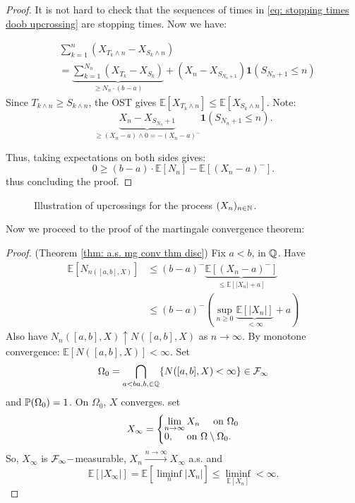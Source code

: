 \documentclass{article}
\begin{document}
\begin{proof}
	It is not hard to check that the sequences of times in \ref{eq: stopping times doob upcrossing} are stopping times. Now we have:

\[
\begin{array}{ll}
   &\displaystyle\sum^{n}_{k=1}(X_{T_{k}\land n}-X_{S_{k}\land n})\\
   &=\underbrace{\displaystyle\sum^{N_{n}}_{k=1} (X_{T_{k}}-X_{S_{k}})}_{\geq N_{n}\cdot (b-a)} + (X_{n}-X_{S_{N_{n}+1}}) \mathbf{1}(S_{N_{n}+1}\leq n)
\end{array}
\]
Since $ T_{k\land n}\geq S_{k\land n}$, the OST gives $\mathbb{E}[X_{T_{k}\land n}]\leq\mathbb{E}[X_{S_{k}\land n}]$. Note: 
\[
\underbrace{X_{n}-X_{S_{N_{n}}+1}}_{\geq (X_{n}-a) \land 0 = -(X_{n}-a)^{-}} \mathbf{1}(S_{N_{n}+1}\leq n).\]

Thus, taking expectations on both sides gives:	
	\[
		0 \geq (b-a)\cdot\mathbb{E}[N_{n}]-\mathbb{E}[(X_{n}-a)^{-}].
	\]
	thus concluding the proof.
\end{proof}


\begin{figure}[H]
    \centering
    
    \caption{Illustration of upcrossings for the process $ (X_{n})_{n\in\mathbb{N}}$.}
    \label{fig: doob upcrossing}
\end{figure}

Now we proceed to the proof of the martingale convergence theorem:

\begin{proof}{(Theorem \ref{thm: a.s. mg conv thm disc})}
Fix $ a<b$, in $ \mathbb{Q}$. Have 
\[
\begin{array}{ll}
	\mathbb{E}[N_{n([a,b], X)}] &\leq(b-a)^{-}\underbrace{\mathbb{E}[(X_{n}-a)^{-}]}_{\leq\mathbb{E}[|X_{n}|+a]} \\
				    &\leq  (b-a)^{-} \left( \displaystyle\sup_{n\geq 0}\underbrace{\mathbb{E}[|X_{n}|]}_{<\infty}+a \right)
\end{array}
\]
Also have $ N_{n}([a,b], X)\uparrow N([a,b], X)$
as $ n\to \infty$. By monotone convergence: $ \mathbb{E}[N([a,b], X)]<\infty$. Set 
\[
	\Omega_{0} =\displaystyle\bigcap_{a<b \\ a,b, \in \mathbb{Q}}\{N([a,b], X)<\infty\}\in \mathcal{F}_{\infty} 
\]
and $ \mathbb{P}(\Omega_{0})=1$. On $ \Omega_{0}$, $ X$ converges. set
\[
X_{\infty} = \left\lbrace
\begin{array}{@{}l@{}}
	\displaystyle \lim_{n\to \infty}X_{n} \quad \text{ on } \Omega_{0}  \\
	0, \quad \text{ on } \Omega\setminus \Omega_{0}.
    
\end{array}\right.
\]
So, $ X_{\infty}$ is $ \mathcal{F}_{\infty}-$measurable, $X_{n}\stackrel{n\to \infty}{\longrightarrow}X_{\infty} $ a.s. and 
\[
	\mathbb{E}[|X_{\infty}|] =\mathbb{E}[\displaystyle\liminf_{n}|X_{n}| ]\leq \displaystyle\liminf_{\mathbb{E}[X_{n}]}<\infty.  
\]
\end{proof}
\end{document}
